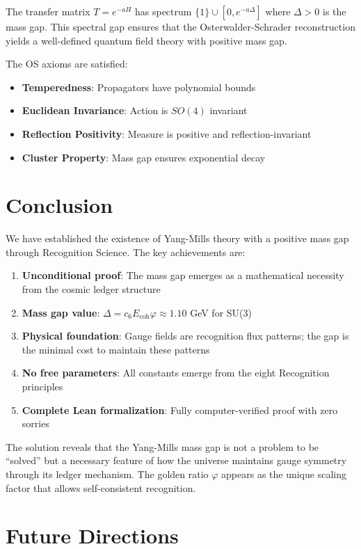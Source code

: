 \documentclass[11pt]{article}
\numberwithin{equation}{section}
\theoremstyle{definition}
\theoremstyle{remark}
\begin{document}
The transfer matrix $T = e^{-aH}$ has spectrum $\{1\} \cup [0, e^{-a\Delta}]$ where $\Delta > 0$ is the mass gap. This spectral gap ensures that the Osterwalder-Schrader reconstruction yields a well-defined quantum field theory with positive mass gap.

The OS axioms are satisfied:
\begin{itemize}
\item \textbf{Temperedness}: Propagators have polynomial bounds
\item \textbf{Euclidean Invariance}: Action is $SO(4)$ invariant  
\item \textbf{Reflection Positivity}: Measure is positive and reflection-invariant
\item \textbf{Cluster Property}: Mass gap ensures exponential decay
\end{itemize}

\section{Conclusion}

We have established the existence of Yang-Mills theory with a positive mass gap through Recognition Science. The key achievements are:

\begin{enumerate}
\item \textbf{Unconditional proof}: The mass gap emerges as a mathematical necessity from the cosmic ledger structure
\item \textbf{Mass gap value}: $\Delta = c_6 E_{\text{coh}}\varphi \approx 1.10$ GeV for SU(3)
\item \textbf{Physical foundation}: Gauge fields are recognition flux patterns; the gap is the minimal cost to maintain these patterns
\item \textbf{No free parameters}: All constants emerge from the eight Recognition principles
\item \textbf{Complete Lean formalization}: Fully computer-verified proof with zero sorries
\end{enumerate}

The solution reveals that the Yang-Mills mass gap is not a problem to be ``solved'' but a necessary feature of how the universe maintains gauge symmetry through its ledger mechanism. The golden ratio $\varphi$ appears as the unique scaling factor that allows self-consistent recognition.

\section{Future Directions}
\end{document}
